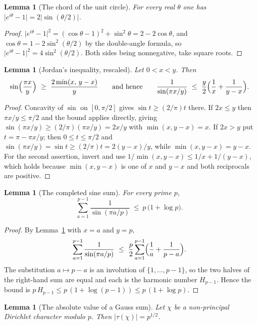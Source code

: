 \documentclass[11pt,reqno]{amsart}
\theoremstyle{plain}
\newtheorem{lemma}[theorem]{Lemma}
\theoremstyle{definition}
\theoremstyle{remark}
\begin{document}
\begin{lemma}[The chord of the unit circle]\label{lem:chord}
For every real $\theta$ one has $\bigl|e^{i\theta}-1\bigr|=2\bigl|\sin(\theta/2)\bigr|$.
\end{lemma}

\begin{proof}
$\bigl|e^{i\theta}-1\bigr|^{2}=(\cos\theta-1)^{2}+\sin^{2}\theta=2-2\cos\theta$, and
$\cos\theta=1-2\sin^{2}(\theta/2)$ by the double-angle formula, so
$\bigl|e^{i\theta}-1\bigr|^{2}=4\sin^{2}(\theta/2)$. Both sides being nonnegative, take square
roots.
\end{proof}

\begin{lemma}[Jordan's inequality, rescaled]\label{lem:jordan}
Let $0<x<y$. Then
\[
  \sin\Bigl(\frac{\pi x}{y}\Bigr)\ \ge\ \frac{2\min(x,\,y-x)}{y}
  \qquad\text{and hence}\qquad
  \frac1{\sin(\pi x/y)}\ \le\ \frac y2\Bigl(\frac1x+\frac1{y-x}\Bigr).
\]
\end{lemma}

\begin{proof}
Concavity of $\sin$ on $[0,\pi/2]$ gives $\sin t\ge (2/\pi)t$ there. If $2x\le y$ then
$\pi x/y\le\pi/2$ and the bound applies directly, giving
$\sin(\pi x/y)\ge (2/\pi)(\pi x/y)=2x/y$ with $\min(x,y-x)=x$. If $2x>y$ put $t=\pi-\pi x/y$;
then $0\le t\le \pi/2$ and $\sin(\pi x/y)=\sin t\ge (2/\pi)t=2(y-x)/y$, while
$\min(x,y-x)=y-x$. For the second assertion, invert and use
$1/\min(x,y-x)\le 1/x+1/(y-x)$, which holds because $\min(x,y-x)$ is one of $x$ and $y-x$ and
both reciprocals are positive.
\end{proof}

\begin{lemma}[The completed sine sum]\label{lem:sinesum}
For every prime $p$,
\[
  \sum_{a=1}^{p-1}\frac1{\sin(\pi a/p)}\ \le\ p\,\bigl(1+\log p\bigr).
\]
\end{lemma}

\begin{proof}
By Lemma~\ref{lem:jordan} with $x=a$ and $y=p$,
\[
  \sum_{a=1}^{p-1}\frac1{\sin(\pi a/p)}
  \ \le\ \frac p2\sum_{a=1}^{p-1}\Bigl(\frac1a+\frac1{p-a}\Bigr).
\]
The substitution $a\mapsto p-a$ is an involution of $\{1,\dots,p-1\}$, so the two halves of the
right-hand sum are equal and each is the harmonic number $H_{p-1}$. Hence the bound is
$p\,H_{p-1}\le p\,(1+\log(p-1))\le p\,(1+\log p)$.
\end{proof}

\begin{lemma}[The absolute value of a Gauss sum]\label{lem:gauss}
Let $\chi$ be a non-principal Dirichlet character modulo $p$. Then $|\tau(\chi)|=p^{1/2}$.
\end{lemma}
\end{document}
